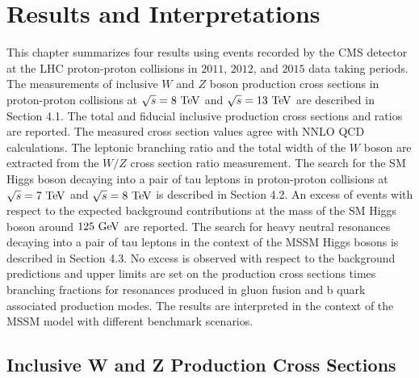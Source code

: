 \chapter{Results and Interpretations}

This chapter summarizes four results using events recorded by the CMS detector at the LHC proton-proton collisions in $2011$, $2012$, and $2015$ data taking periods. The measurements of inclusive $W$ and $Z$ boson production cross sections in proton-proton collisions at $\sqrt{s}=8~\mathrm{Te\kern -0.1em V}$ and $\sqrt{s}=13~\mathrm{Te\kern -0.1em V}$ are described in Section 4.1. The total and fiducial inclusive production cross sections and ratios are reported. The measured cross section values agree with NNLO QCD calculations. The leptonic branching ratio and the total width of the $W$ boson are extracted from the $W/Z$ cross section ratio measurement. The search for the SM Higgs boson decaying into a pair of tau leptons in proton-proton collisions at $\sqrt{s}=7~\mathrm{Te\kern -0.1em V}$ and $\sqrt{s}=8~\mathrm{Te\kern -0.1em V}$ is described in Section 4.2. An excess of events with respect to the expected background contributions at the mass of the SM Higgs boson around $125~\mathrm{Ge\kern -0.1em V}$ are reported. The search for heavy neutral resonances decaying into a pair of tau leptons in the context of the MSSM Higgs bosons is described in Section 4.3. No excess is observed with respect to the background predictions and upper limits are set on the production cross sections times branching fractions for resonances produced in gluon fusion and b quark associated production modes. The results are interpreted in the context of the MSSM model with different benchmark scenarios.  
 
\section{Inclusive W and Z Production Cross Sections}

